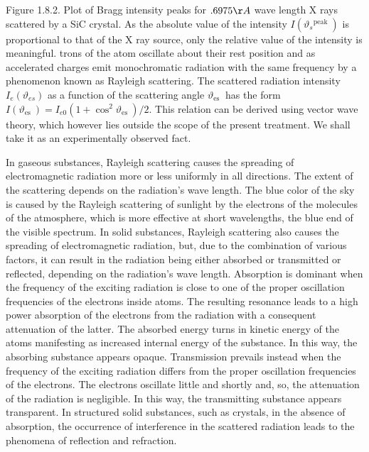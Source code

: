 \documentclass{article}
\begin{document}
Figure 1.8.2. Plot of Bragg intensity peaks for $.6975 \AA$ wave length X rays scattered by a SiC crystal. As the absolute value of the intensity $I\left(\vartheta_{s}{ }^{\text {peak }}\right)$ is proportional to that of the X ray source, only the relative value of the intensity is meaningful.
trons of the atom oscillate about their rest position and as accelerated charges emit monochromatic radiation with the same frequency by a phenomenon known as Rayleigh scattering. The scattered radiation intensity $I_{e}\left(\vartheta_{e s}\right)$ as a function of the scattering angle $\vartheta_{\text {es }}$ has the form $I\left(\vartheta_{\text {es }}\right)=I_{e 0}\left(1+\cos ^{2} \vartheta_{\text {es }}\right) / 2$. This relation can be derived using vector wave theory, which however lies outside the scope of the present treatment. We shall take it as an experimentally observed fact.

In gaseous substances, Rayleigh scattering causes the spreading of electromagnetic radiation more or less uniformly in all directions. The extent of the scattering depends on the radiation's wave length. The blue color of the sky is caused by the Rayleigh scattering of sunlight by the electrons of the molecules of the atmosphere, which is more effective at short wavelengths, the blue end of the
visible spectrum. In solid substances, Rayleigh scattering also causes the spreading of electromagnetic radiation, but, due to the combination of various factors, it can result in the radiation being either absorbed or transmitted or reflected, depending on the radiation's wave length. Absorption is dominant when the frequency of the exciting radiation is close to one of the proper oscillation frequencies of the electrons inside atoms. The resulting resonance leads to a high power absorption of the electrons from the radiation with a consequent attenuation of the latter. The absorbed energy turns in kinetic energy of the atoms manifesting as increased internal energy of the substance. In this way, the absorbing substance appears opaque. Transmission prevails instead when the frequency of the exciting radiation differs from the proper oscillation frequencies of the electrons. The electrons oscillate little and shortly and, so, the attenuation of the radiation is negligible. In this way, the transmitting substance appears transparent. In structured solid substances, such as crystals, in the absence of absorption, the occurrence of interference in the scattered radiation leads to the phenomena of reflection and refraction.
\end{document}
